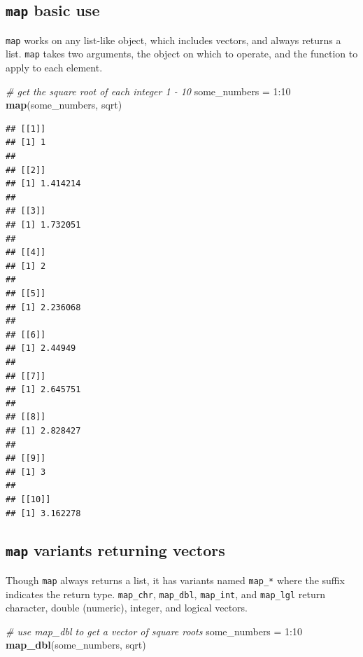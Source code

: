 \documentclass[]{book}
\newenvironment{Shaded}{}{}
\newcommand{\CommentTok}[1]{\textcolor[rgb]{0.38,0.63,0.69}{\textit{#1}}}
\newcommand{\DecValTok}[1]{\textcolor[rgb]{0.25,0.63,0.44}{#1}}
\newcommand{\KeywordTok}[1]{\textcolor[rgb]{0.00,0.44,0.13}{\textbf{#1}}}
\newcommand{\NormalTok}[1]{#1}
\newcommand{\OperatorTok}[1]{\textcolor[rgb]{0.40,0.40,0.40}{#1}}
\newcommand{\StringTok}[1]{\textcolor[rgb]{0.25,0.44,0.63}{#1}}
\begin{document}
\hypertarget{map-basic-use}{%
\subsection{\texorpdfstring{\texttt{map} basic use}{map basic use}}\label{map-basic-use}}

\texttt{map} works on any list-like object, which includes vectors, and always returns a list. \texttt{map} takes two arguments, the object on which to operate, and the function to apply to each element.

\begin{Shaded}
\begin{Highlighting}[]
\CommentTok{# get the square root of each integer 1 - 10}
\NormalTok{some_numbers =}\StringTok{ }\DecValTok{1}\OperatorTok{:}\DecValTok{10}
\KeywordTok{map}\NormalTok{(some_numbers, sqrt)}
\end{Highlighting}
\end{Shaded}

\begin{verbatim}
## [[1]]
## [1] 1
## 
## [[2]]
## [1] 1.414214
## 
## [[3]]
## [1] 1.732051
## 
## [[4]]
## [1] 2
## 
## [[5]]
## [1] 2.236068
## 
## [[6]]
## [1] 2.44949
## 
## [[7]]
## [1] 2.645751
## 
## [[8]]
## [1] 2.828427
## 
## [[9]]
## [1] 3
## 
## [[10]]
## [1] 3.162278
\end{verbatim}

\hypertarget{map-variants-returning-vectors}{%
\subsection{\texorpdfstring{\texttt{map} variants returning vectors}{map variants returning vectors}}\label{map-variants-returning-vectors}}

Though \texttt{map} always returns a list, it has variants named \texttt{map\_*} where the suffix indicates the return type.
\texttt{map\_chr}, \texttt{map\_dbl}, \texttt{map\_int}, and \texttt{map\_lgl} return character, double (numeric), integer, and logical vectors.

\begin{Shaded}
\begin{Highlighting}[]
\CommentTok{# use map_dbl to get a vector of square roots}
\NormalTok{some_numbers =}\StringTok{ }\DecValTok{1}\OperatorTok{:}\DecValTok{10}
\KeywordTok{map_dbl}\NormalTok{(some_numbers, sqrt)}
\end{Highlighting}
\end{Shaded}
\end{document}

